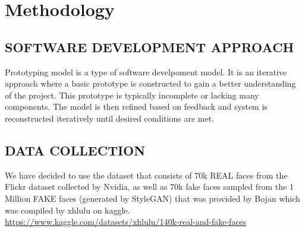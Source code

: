    \chapter{Methodology}
       \section{SOFTWARE DEVELOPMENT APPROACH}
        Prototyping model is a type of software develpoment model. It is an iterative approach where a basic prototype is constructed to gain a better understanding of the project. This prototype is typically incomplete or lacking many components. The model is then refined based on feedback and system is reconstructed iteratively until desired conditions are met.
         \begin{figure}[hbt!]
        \end{figure}
        \section{DATA COLLECTION}
        We have decided to use the dataset that consists of 70k REAL faces from the Flickr dataset collected by Nvidia, as well as 70k fake faces sampled from the 1 Million FAKE faces (generated by StyleGAN) that was provided by Bojan which was compiled by xhlulu on kaggle.\\
        \url{https://www.kaggle.com/datasets/xhlulu/140k-real-and-fake-faces}
    
